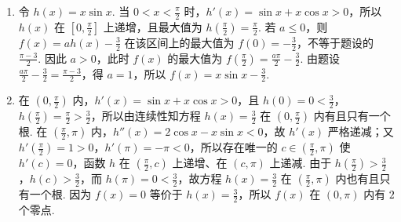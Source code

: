\begin{solution}
\begin{enumerate}
\item 令 \(h(x)=x\sin x\). 当 \(0<x<\frac{\pi}{2}\) 时，\(h'(x)=\sin x+x\cos x>0\)，所以 \(h(x)\) 在 \([0,\frac{\pi}{2}]\) 上递增，且最大值为 \(h\left(\frac{\pi}{2}\right)=\frac{\pi}{2}\). 若 \(a\leqslant0\)，则 \(f(x)=ah(x)-\frac32\) 在该区间上的最大值为 \(f(0)=-\frac32\)，不等于题设的 \(\frac{\pi-3}{2}\). 因此 \(a>0\)，此时 \(f(x)\) 的最大值为 \(f\left(\frac{\pi}{2}\right)=\frac{a\pi}{2}-\frac32\). 由题设 \(\frac{a\pi}{2}-\frac32=\frac{\pi-3}{2}\)，得 \(a=1\)，所以 \(f(x)=x\sin x-\frac32\).
\item 在 \((0,\frac{\pi}{2})\) 内，\(h'(x)=\sin x+x\cos x>0\)，且 \(h(0)=0<\frac32\)，\(h\left(\frac{\pi}{2}\right)=\frac\pi2>\frac32\)，所以由连续性知方程 \(h(x)=\frac32\) 在 \((0,\frac{\pi}{2})\) 内有且只有一个根. 在 \((\frac{\pi}{2},\pi)\) 内，\(h''(x)=2\cos x-x\sin x<0\)，故 \(h'(x)\) 严格递减；又 \(h'\left(\frac\pi2\right)=1>0\)，\(h'(\pi)=-\pi<0\)，所以存在唯一的 \(c\in(\frac\pi2,\pi)\) 使 \(h'(c)=0\)，函数 \(h\) 在 \((\frac\pi2,c)\) 上递增、在 \((c,\pi)\) 上递减. 由于 \(h\left(\frac\pi2\right)>\frac32\)，\(h(c)>\frac32\)，而 \(h(\pi)=0<\frac32\)，故方程 \(h(x)=\frac32\) 在 \((\frac\pi2,\pi)\) 内也有且只有一个根. 因为 \(f(x)=0\) 等价于 \(h(x)=\frac32\)，所以 \(f(x)\) 在 \((0,\pi)\) 内有 \(2\) 个零点.
\end{enumerate}
\end{solution}
